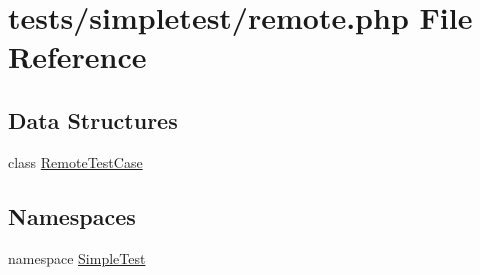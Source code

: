 \hypertarget{remote_8php}{\section{tests/simpletest/remote.php File Reference}
\label{remote_8php}
}
\subsection*{Data Structures}
\begin{DoxyCompactItemize}
\item 
class \hyperlink{class_remote_test_case}{Remote\-Test\-Case}
\end{DoxyCompactItemize}
\subsection*{Namespaces}
\begin{DoxyCompactItemize}
\item 
namespace \hyperlink{namespace_simple_test}{Simple\-Test}
\end{DoxyCompactItemize}
